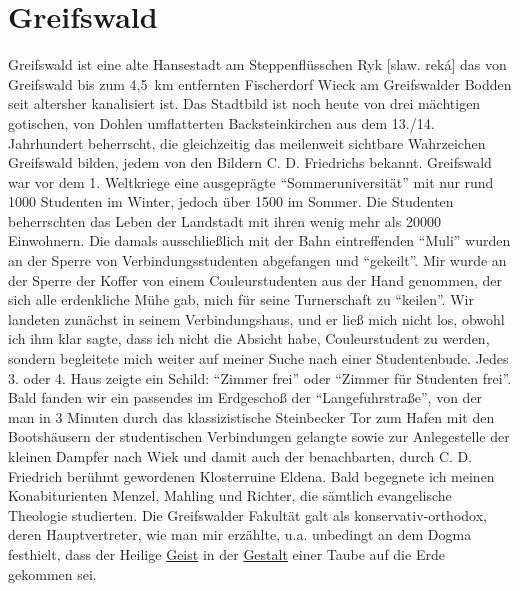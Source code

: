 \section{Greifswald}
Greifswald ist eine alte Hansestadt am Steppenflüsschen Ryk [slaw. reká] das von Greifswald bis zum 4,5~km entfernten Fischerdorf Wieck am Greifswalder Bodden seit altersher kanalisiert ist. Das Stadtbild ist noch heute von drei mächtigen gotischen, von Dohlen umflatterten Backsteinkirchen aus dem 13./14. Jahrhundert beherrscht, die gleichzeitig das meilenweit sichtbare Wahrzeichen Greifswald bilden, jedem von den Bildern C. D. Friedrichs bekannt. Greifswald war vor dem 1. Weltkriege eine ausgeprägte \enquote{Sommeruniversität} mit nur rund \num{1000} Studenten im Winter, jedoch über \num{1500} im Sommer. Die Studenten beherrschten das Leben der Landstadt mit ihren wenig mehr als \num{20000} Einwohnern. Die damals ausschließlich mit der Bahn eintreffenden \enquote{Muli} wurden an der Sperre von Verbindungsstudenten abgefangen und \enquote{gekeilt}. Mir wurde an der Sperre der Koffer von einem Couleurstudenten aus der Hand genommen, der sich alle erdenkliche Mühe gab, mich für seine Turnerschaft zu \enquote{keilen}. Wir landeten zunächst in seinem Verbindungshaus, und er ließ mich nicht los, obwohl ich ihm klar sagte, dass ich nicht die Absicht habe, Couleurstudent zu werden, sondern begleitete mich weiter auf meiner Suche nach einer Studentenbude. Jedes 3. oder 4. Haus zeigte ein Schild: \enquote{Zimmer frei} oder \enquote{Zimmer für Studenten frei}. Bald fanden wir ein passendes im Erdgeschoß der \enquote{Langefuhrstraße}, von der man in 3 Minuten durch das klassizistische Steinbecker Tor zum Hafen mit den Bootshäusern der studentischen Verbindungen gelangte sowie zur Anlegestelle der kleinen Dampfer nach Wiek und damit auch der benachbarten, durch C. D. Friedrich berühmt gewordenen Klosterruine Eldena. Bald begegnete ich meinen Konabiturienten Menzel, Mahling und Richter, die sämtlich evangelische Theologie studierten. Die Greifswalder Fakultät galt als konservativ-orthodox, deren Hauptvertreter, wie man mir erzählte, u.a. unbedingt an dem Dogma festhielt, dass der Heilige \underline{Geist} in der \underline{Gestalt} einer Taube auf die Erde gekommen sei.

